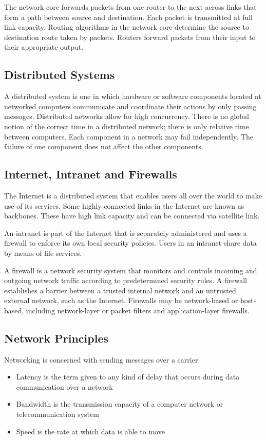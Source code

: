 The network core forwards packets from one router to the next across links that form a path between source and destination.
Each packet is transmitted at full link capacity.
Routing algorithms in the network core determine the source to destination route taken by packets.
Routers forward packets from their input to their appropriate output.

\subsection{Distributed Systems}

A distributed system is one in which hardware or software components located at networked computers communicate and coordinate their actions by only passing messages.
Distributed networks allow for high concurrency.
There is no global notion of the correct time in a distributed network; there is only relative time between computers.
Each component in a network may fail independently.
The failure of one component does not affect the other components.

\subsection{Internet, Intranet and Firewalls}

The Internet is a distributed system that enables users all over the world to make use of its services.
Some highly connected links in the Internet are known as backbones.
These have high link capacity and can be connected via satellite link.

An intranet is part of the Internet that is separately administered and uses a firewall to enforce its own local security policies.
Users in an intranet share data by means of file services.

A firewall is a network security system that monitors and controls incoming and outgoing network traffic according to predetermined security rules.
A firewall establishes a barrier between a trusted internal network and an untrusted external network, such as the Internet.
Firewalls may be network-based or host-based, including network-layer or packet filters and application-layer firewalls.

\subsection{Network Principles}

Networking is concerned with sending messages over a carrier.
\begin{itemize}
  \item Latency is the term given to any kind of delay that occurs during data communication over a network
  \item Bandwidth is the transmission capacity of a computer network or telecommunication system
  \item Speed is the rate at which data is able to move
\end{itemize}

